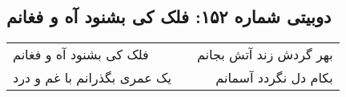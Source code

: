 \begin{center}
\section*{دوبیتی شماره ۱۵۲: فلک کی بشنود آه و فغانم}
\label{sec:152}
\begin{longtable}{l p{0.5cm} r}
فلک کی بشنود آه و فغانم
&&
بهر گردش زند آتش بجانم
\\
یک عمری بگذرانم با غم و درد
&&
بکام دل نگردد آسمانم
\\
\end{longtable}
\end{center}
